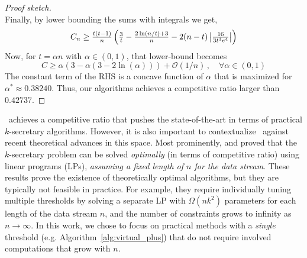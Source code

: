 \begin{proof}[Proof sketch]
\begin{equation}
\end{equation}
Finally, by lower bounding the sums with integrals we get, 
\begin{align}
    C_n \geq 
    \tfrac{t(t -1)}{n} \left(\tfrac{3}{t}-\tfrac{2\ln(n/t) + 3}{n} - 2(n-t) \left| \tfrac{16}{3 t^3 e^4} \right|\right) \notag
\end{align}
Now, for $t = \alpha n$ with $\alpha \in (0, 1)$, that lower-bound becomes
\begin{equation}
\label{eq:alpha_eqn}
C \geq \alpha (3 - \alpha(3 - 2\ln (\alpha))) + \mathcal{O}(1/n) \,,\quad \forall \alpha \in (0,1)
\end{equation}
The constant term of the RHS is a concave function of $\alpha$ that is maximized for $\alpha^* \approx 0.38240$. Thus, our algorithms achieves a competitive ratio larger than $0.42737$.
\end{proof}

\label{connection_to_prior_work}
\algoname\ achieves a competitive ratio that pushes the state-of-the-art in terms of practical $k$-secretary algorithms.
However, it is also important to contextualize \algoname\ against recent theoretical advances in this space. 
Most prominently, \citet{buchbinder2014secretary} and \citet{chan2014revealing} proved that the $k$-secretary problem can be solved {\em optimally} (in terms of competitive ratio) using linear programs (LPs), {\em assuming a fixed length of $n$ for the data stream}.
These results prove the existence of theoretically optimal algorithms, but they are typically not feasible in practice.
For example, they require individually tuning multiple thresholds by solving a separate LP with $\Omega(n k^2)$ parameters for each length of the data stream $n$, and the number of constraints grows to infinity as  $n\rightarrow\infty$. 
In this work, we chose to focus on practical methods with a \emph{single} threshold (e.g. Algorithm~\ref{alg:virtual_plus}) that do not require involved computations that grow with $n$.

